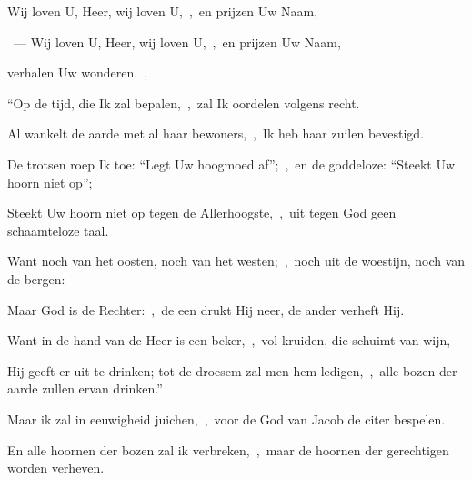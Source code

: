 \documentclass[12pt,twoside,a5paper]{article}
\begin{document}





\begin{halfparskip}
  Wij loven U, Heer, wij loven U,~\sep\ en prijzen Uw Naam,

  ~---  Wij loven U, Heer, wij loven U,~\sep\ en prijzen Uw Naam,

  verhalen Uw wonderen.~\sep

  ``Op de tijd, die Ik zal bepalen,~\sep\ zal Ik oordelen volgens recht.

  Al wankelt de aarde met al haar bewoners,~\sep\ Ik heb haar zuilen bevestigd.

  De trotsen roep Ik toe: ``Legt Uw hoogmoed af'';~\sep\ en de goddeloze: ``Steekt Uw hoorn niet op'';

  Steekt Uw hoorn niet op tegen de Allerhoogste,~\sep\ uit tegen God geen schaamteloze taal.

  Want noch van het oosten, noch van het westen;~\sep\ noch uit de woestijn, noch van de bergen:

  Maar God is de Rechter:~\sep\ de een drukt Hij neer, de ander verheft Hij.

  Want in de hand van de Heer is een beker,~\sep\ vol kruiden, die schuimt van wijn,

  Hij geeft er uit te drinken; tot de droesem zal men hem ledigen,~\sep\ alle bozen der aarde zullen ervan drinken.''

  Maar ik zal in eeuwigheid juichen,~\sep\ voor de God van Jacob de citer bespelen.

  En alle hoornen der bozen zal ik verbreken,~\sep\ maar de hoornen der gerechtigen worden verheven.
\end{halfparskip}
\end{document}
